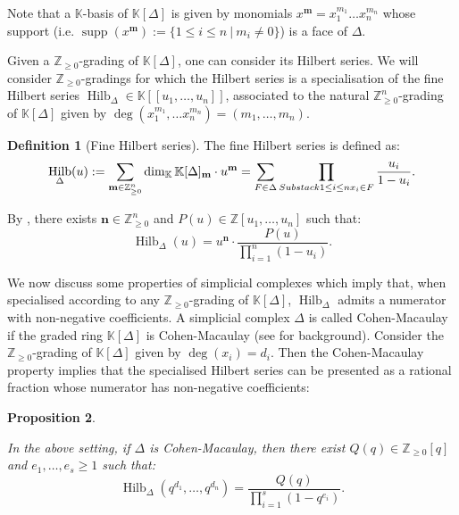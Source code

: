 \documentclass[11pt,english]{article}
\numberwithin{equation}{section}
\numberwithin{figure}{section}
\theoremstyle{definition}
\newtheorem{df}{Definition}[subsection]
\theoremstyle{plain}
\newtheorem{prop}[df]{Proposition}
\theoremstyle{remark}
\DeclareMathOperator{\supp}{supp}
\DeclareMathOperator{\Hilb}{Hilb}
\newcommand\mm{\mathbf{m}}
\newcommand\ZZ{\mathbb{Z}}
\newcommand\KK{\mathbb{K}}
\begin{document}
Note that a $\KK$-basis of $\KK[\Delta]$ is given by monomials $x^{\mm}=x_{1}^{m_{1}}\ldots x_{n}^{m_{n}}$
whose support (i.e. $\supp(x^{\mm}):=\{1\leq i\leq n\ \vert\ m_{i}\ne0\}$)
is a face of $\Delta$.

Given a $\ZZ_{\geq0}$-grading of $\KK[\Delta]$, one can consider
its Hilbert series. We will consider $\ZZ_{\geq0}$-gradings for which
the Hilbert series is a specialisation of the fine Hilbert series
$\Hilb_{\Delta}\in\KK[[u_{1},\ldots,u_{n}]]$, associated to the natural
$\ZZ_{\geq0}^{n}$-grading of $\KK[\Delta]$ given by $\deg(x_{1}^{m_{1}},\ldots x_{n}^{m_{n}})=(m_{1},\ldots,m_{n})$. 

\begin{df}[Fine Hilbert series]

The fine Hilbert series is defined as:\[
\Hilb_{\Delta}(u):=\sum_{\mm\in\ZZ_{\geq0}^{n}}\dim_{\KK}\KK[\Delta]_{\mm}\cdot u^{\mm}
=\sum_{F\in\Delta}\prod_{Substack{1\leq i\leq n \\ x_i\in F}}\frac{u_i}{1-u_i}.
\]

\end{df}

By \cite[Ch. I, Thm. 2.3.]{Sta07}, there exists $\mathbf{n}\in\ZZ_{\geq0}^{n}$
and $P(u)\in\ZZ[u_{1},\ldots,u_{n}]$ such that:\[
\Hilb_{\Delta}(u)=u^{\mathbf{n}}\cdot\frac{P(u)}{\prod_{i=1}^n(1-u_i)}.
\]

We now discuss some properties of simplicial complexes which imply
that, when specialised according to any $\ZZ_{\geq0}$-grading of
$\KK[\Delta]$, $\Hilb_{\Delta}$ admits a numerator with non-negative
coefficients. A simplicial complex $\Delta$ is called Cohen-Macaulay
if the graded ring $\KK[\Delta]$ is Cohen-Macaulay (see \cite[Ch. I, \S5]{Sta07}
for background). Consider the $\ZZ_{\geq0}$-grading of $\KK[\Delta]$
given by $\deg(x_{i})=d_{i}$. Then the Cohen-Macaulay property implies
that the specialised Hilbert series can be presented as a rational
fraction whose numerator has non-negative coefficients:

\begin{prop}{\cite[Ch. I, \S 5.2. - Thm. 5.10.]{Sta07}} \label{Prop/CMHilb}

In the above setting, if $\Delta$ is Cohen-Macaulay, then there exist
$Q(q)\in\ZZ_{\geq0}[q]$ and $e_{1},\ldots,e_{s}\geq1$ such that:\[
\Hilb_{\Delta}(q^{d_1},\ldots,q^{d_n})=\frac{Q(q)}{\prod_{i=1}^s(1-q^{e_i})}.
\]

\end{prop}
\end{document}
